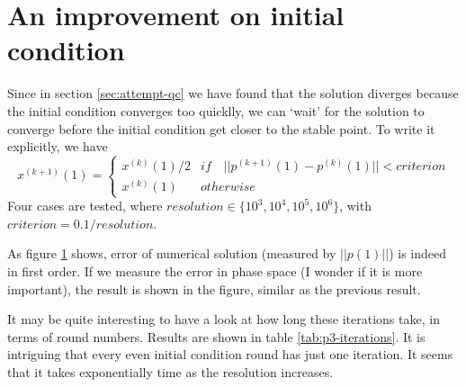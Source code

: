 \documentclass[a4paper]{article}
\begin{document}
\section{An improvement on initial condition}
Since in section \ref{sec:attempt-qc} we have found that the solution diverges because the initial condition converges too quicklly, we can `wait' for the solution to converge before the initial condition get closer to the stable point.
To write it explicitly, we have
\begin{equation}
	x^{(k+1)}(1) = 
	\begin{cases}
		x^{(k)}(1) / 2 & if \quad ||p^{(k+1)}(1) - p^{(k)}(1)|| < criterion \\
		x^{(k)}(1) & otherwise
	\end{cases}
\end{equation}
Four cases are tested, where $resolution \in \{10^3, 10^4, 10^5, 10^6\}$, with $criterion = 0.1 / resolution$.
\begin{figure}[h]
	\centering
	\label{fig:p3-improved-solution}
\end{figure}

As figure \ref{fig:p3-improved-solution} shows, error of numerical solution (measured by $||p(1)||$) is indeed in first order.
If we measure the error in phase space (I wonder if it is more important), the result is shown in the figure, similar as the previous result.

It may be quite interesting to have a look at how long these iterations take, in terms of round numbers.
Results are shown in table \ref{tab:p3-iterations}.
It is intriguing that every even initial condition round has just one iteration.
It seems that it takes exponentially time as the resolution increases.
\end{document}
